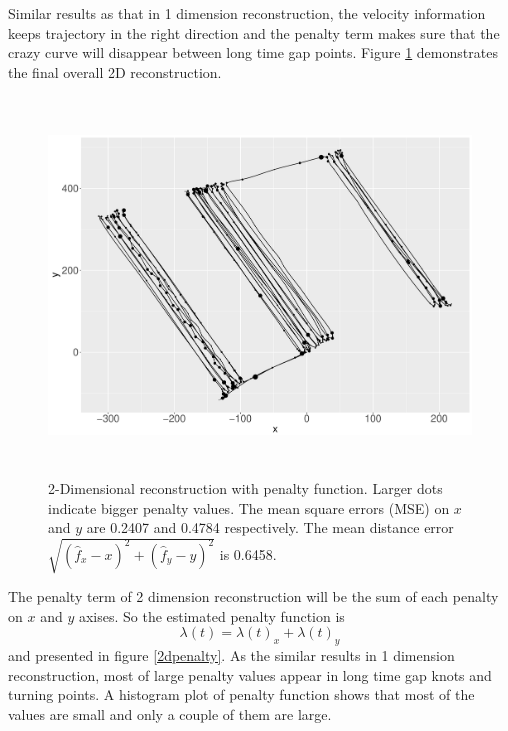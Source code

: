 Similar results as that in 1 dimension reconstruction, the velocity information keeps trajectory in the right direction and the penalty term makes sure that the crazy curve will disappear between long time gap points. Figure \ref{2dxy} demonstrates the final overall 2D reconstruction. 

\begin{figure}
  \centering
    \includegraphics[width=\textwidth,height=10cm]{Chapters/02TractorSplineTheory/plot/ggplot/ggRealdataXYPenaltyPath.pdf} 
  \caption{2-Dimensional reconstruction with penalty function. Larger dots indicate bigger penalty values. The mean square errors (MSE) on $x$ and $y$ are 0.2407 and 0.4784 respectively. The mean distance error $\sqrt{(\hat{f}_x-x)^2+ (\hat{f}_y-y)^2}$ is 0.6458.}\label{2dxy}
\end{figure}

The penalty term of 2 dimension reconstruction will be the sum of each penalty on $x$ and $y$ axises. So the estimated penalty function is
\begin{equation}
\lambda(t)=\lambda(t)_x+\lambda(t)_y
\end{equation}
and presented in figure \ref{2dpenalty}. As the similar results in 1 dimension reconstruction, most of large penalty values appear in long time gap knots and turning points. A histogram plot of penalty function shows that most of the values are small and only a couple of them are large. 

